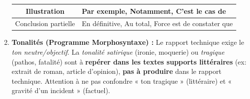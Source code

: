 \documentclass[11pt]{article}
\begin{document}
\begin{methode}
\begin{enumerate}
\begin{center}
\begin{tabular}{|c|l|}
                Illustration & Par exemple, Notamment, C'est le cas de \\\hline
                Conclusion partielle & En définitive, Au total, Force est de constater que \\\hline
            \end{tabular}
            \end{center}
        \item \textbf{Tonalités (Programme Morphosyntaxe) :} Le rapport technique exige le \emph{ton neutre/objectif}. La \emph{tonalité satirique} (ironie, moquerie) ou \emph{tragique} (pathos, fatalité) sont à \textbf{repérer dans les textes supports littéraires} (ex: extrait de roman, article d'opinion), \textbf{pas à produire} dans le rapport technique. Attention à ne pas confondre « ton tragique » (littéraire) et « gravité d'un incident » (factuel).
    \end{enumerate}
\end{methode}
\end{document}
